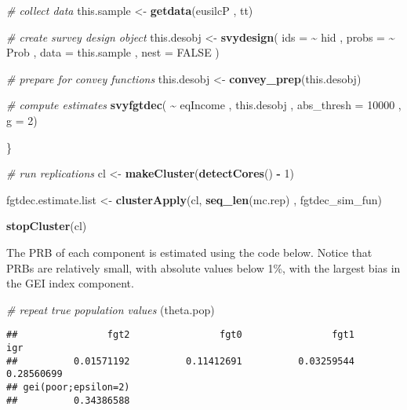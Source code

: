 \documentclass[
]{book}
\newenvironment{Shaded}{\begin{snugshade}}{\end{snugshade}}
\newcommand{\AttributeTok}[1]{\textcolor[rgb]{0.13,0.29,0.53}{#1}}
\newcommand{\CommentTok}[1]{\textcolor[rgb]{0.56,0.35,0.01}{\textit{#1}}}
\newcommand{\ConstantTok}[1]{\textcolor[rgb]{0.56,0.35,0.01}{#1}}
\newcommand{\DecValTok}[1]{\textcolor[rgb]{0.00,0.00,0.81}{#1}}
\newcommand{\FunctionTok}[1]{\textcolor[rgb]{0.13,0.29,0.53}{\textbf{#1}}}
\newcommand{\NormalTok}[1]{#1}
\newcommand{\OtherTok}[1]{\textcolor[rgb]{0.56,0.35,0.01}{#1}}
\newcommand{\SpecialCharTok}[1]{\textcolor[rgb]{0.81,0.36,0.00}{\textbf{#1}}}
\begin{document}
\begin{Shaded}
\begin{Highlighting}[]
  \CommentTok{\# collect data}
\NormalTok{  this.sample }\OtherTok{\textless{}{-}} \FunctionTok{getdata}\NormalTok{(eusilcP , tt)}
  
  \CommentTok{\# create survey design object}
\NormalTok{  this.desobj }\OtherTok{\textless{}{-}}
    \FunctionTok{svydesign}\NormalTok{(}
      \AttributeTok{ids =} \SpecialCharTok{\textasciitilde{}}\NormalTok{ hid ,}
      \AttributeTok{probs =} \SpecialCharTok{\textasciitilde{}}\NormalTok{ Prob ,}
      \AttributeTok{data =}\NormalTok{ this.sample ,}
      \AttributeTok{nest =} \ConstantTok{FALSE}
\NormalTok{    )}
  
  \CommentTok{\# prepare for convey functions}
\NormalTok{  this.desobj }\OtherTok{\textless{}{-}} \FunctionTok{convey\_prep}\NormalTok{(this.desobj)}
  
  \CommentTok{\# compute estimates}
  \FunctionTok{svyfgtdec}\NormalTok{( }\SpecialCharTok{\textasciitilde{}}\NormalTok{ eqIncome , this.desobj , }\AttributeTok{abs\_thresh =} \DecValTok{10000}\NormalTok{ , }\AttributeTok{g =} \DecValTok{2}\NormalTok{)}
  
\NormalTok{\}}

\CommentTok{\# run replications}
\NormalTok{cl }\OtherTok{\textless{}{-}} \FunctionTok{makeCluster}\NormalTok{(}\FunctionTok{detectCores}\NormalTok{() }\SpecialCharTok{{-}} \DecValTok{1}\NormalTok{)}

\NormalTok{fgtdec.estimate.list }\OtherTok{\textless{}{-}}
  \FunctionTok{clusterApply}\NormalTok{(cl, }\FunctionTok{seq\_len}\NormalTok{(mc.rep) , fgtdec\_sim\_fun)}

\FunctionTok{stopCluster}\NormalTok{(cl)}
\end{Highlighting}
\end{Shaded}

The PRB of each component is estimated using the code below. Notice that PRBs are relatively small, with absolute values below 1\%, with the largest bias in the GEI index component.

\begin{Shaded}
\begin{Highlighting}[]
\CommentTok{\# repeat true population values}
\NormalTok{(theta.pop)}
\end{Highlighting}
\end{Shaded}

\begin{verbatim}
##                fgt2                fgt0                fgt1                 igr 
##          0.01571192          0.11412691          0.03259544          0.28560699 
## gei(poor;epsilon=2) 
##          0.34386588
\end{verbatim}
\end{document}
